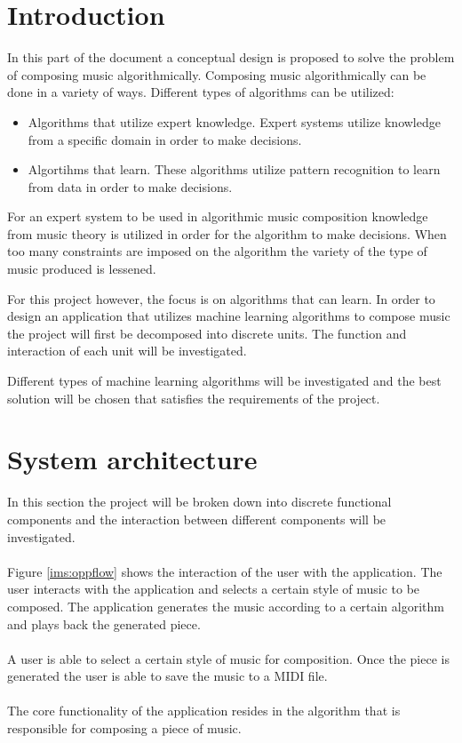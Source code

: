 

\chapter{Introduction}
In this part of the document a conceptual design is proposed to solve the problem of composing music algorithmically.
Composing music algorithmically can be done in a variety of ways. Different types of algorithms can be utilized:
\begin{itemize}
\item Algorithms that utilize expert knowledge. Expert systems utilize knowledge from a specific domain in order to make decisions.
\item Algortihms that learn. These algorithms utilize pattern recognition to learn from data in order to make decisions.
\end{itemize}
For an expert system to be used in algorithmic music composition knowledge from music theory is utilized in order for the algorithm to make decisions. When too many constraints are imposed on the algorithm the variety of the type of music produced is lessened.

For this project however, the focus is on algorithms that can learn. In order to design an application that utilizes machine learning algorithms to compose music the project will first be decomposed into discrete units. The function and interaction of each unit will be investigated. 

Different types of machine learning algorithms will be investigated and the best solution will be chosen that satisfies the requirements of the project.

\chapter{System architecture}
In this section the project will be broken down into discrete functional components and the interaction between different components will be investigated.
\\\\
Figure \ref{ims:oppflow} shows the interaction of the user with the application. 
The user interacts with the application and selects a certain style of music to be composed. The application generates the music according to a certain algorithm and plays back the generated piece. 
\\\\
A user is able to select a certain style of music for composition. Once the piece is generated the user is able to save the music to a \ac{MIDI} file.
\\\\
The core functionality of the application resides in the algorithm that is responsible for composing a piece of music.

